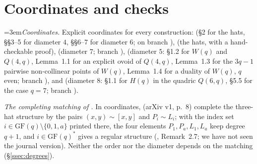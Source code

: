 \documentclass[11pt]{amsart}
\theoremstyle{definition}
\theoremstyle{remark}
\begin{document}
\appendix
\section{Coordinates and checks}\label{app:checks}
\emergencystretch=3em\emph{Coordinates.} Explicit coordinates for every construction:  (\S2 for the hats, \S\S3--5 for diameter $4$, \S\S6--7 for diameter $6$; on branch ),  (the hats, with a hand-checkable proof),  (diameter $7$; branch ),  (diameter $5$: \S1.2 for $W(q)$ and $Q(4,q)$, Lemma~1.1 for an explicit ovoid of $Q(4,q)$, Lemma~1.3 for the $3q-1$ pairwise non-collinear points of $W(q)$, Lemma~1.4 for a duality of $W(q)$, $q$ even; branch ), and  (diameter $8$: \S1.1 for $H(q)$ in the quadric $Q(6,q)$, \S5.5 for the case $q=7$; branch ).

\emph{The completing matching of \cite{AL20}.} In coordinates, \cite{AL20} (arXiv v1, p.~8) complete the three-hat structure by the pairs $(x,y)\sim[x,y]$ and $P_i\sim L_i$; with the index set $i\in\mathrm{GF}(q)\setminus\{0,1,a\}$ printed there, the four elements $P_1,P_a,L_1,L_a$ keep degree $q+1$, and $i\in\mathrm{GF}(q)^*$ gives a regular structure (, Remark~2.7; we have not seen the journal version). Neither the order nor the diameter depends on the matching (\S\ref{ssec:degrees}).
\end{document}
